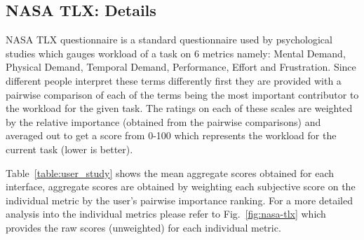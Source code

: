 \documentclass[10pt,twocolumn,letterpaper]{article}
\def\figref#1{Fig.~\ref{#1}}
\def\tabref#1{Table~\ref{#1}}
\begin{document}




\subsection{NASA TLX: Details}
NASA TLX questionnaire \cite{hart1988development} is a standard questionnaire used by psychological studies which gauges workload of a task on 6 metrics namely: Mental Demand, Physical Demand, Temporal Demand, Performance, Effort and Frustration. Since different people interpret these terms differently first they are provided with a pairwise comparison of each of the terms being the most important contributor to the workload for the given task. The ratings on each of these scales are weighted by the relative importance (obtained from the pairwise comparisons) and averaged out to get a score from 0-100 which represents the workload for the current task (lower is better).

\tabref{table:user_study} shows the mean aggregate scores obtained for each interface, aggregate scores are obtained by weighting each subjective score on the individual metric by the user's pairwise importance ranking. For a more detailed analysis into the individual metrics please refer to \figref{fig:nasa-tlx} which provides the raw scores (unweighted) for each individual metric.



\end{document}
